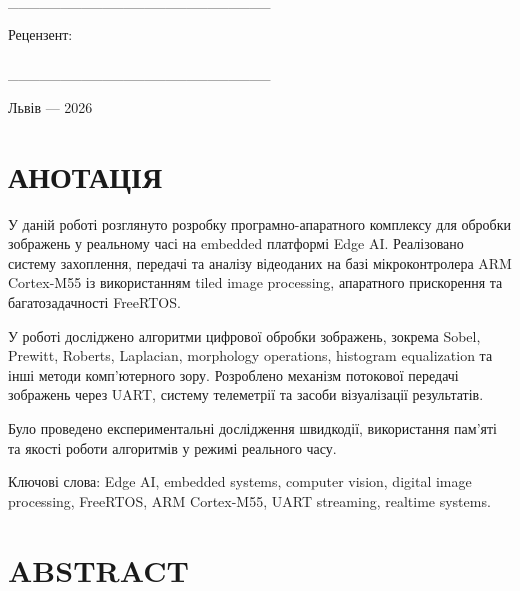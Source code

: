 \documentclass[14pt,a4paper]{extreport}
\begin{document}
\begin{titlepage}
\begin{center}
\begin{flushright}
\underline{\hspace{5cm}}\\
_________________________

\vspace{1cm}

Рецензент:\\

\underline{\hspace{5cm}}\\
_________________________

\end{flushright}

\vfill

Львів --- 2026

\end{center}

\end{titlepage}


\chapter*{АНОТАЦІЯ}

У даній роботі розглянуто розробку програмно-апаратного комплексу для
обробки зображень у реальному часі на embedded платформі Edge AI.
Реалізовано систему захоплення, передачі та аналізу відеоданих на базі
мікроконтролера ARM Cortex-M55 із використанням tiled image processing,
апаратного прискорення та багатозадачності FreeRTOS.

У роботі досліджено алгоритми цифрової обробки зображень, зокрема
Sobel, Prewitt, Roberts, Laplacian, morphology operations,
histogram equalization та інші методи комп’ютерного зору.
Розроблено механізм потокової передачі зображень через UART,
систему телеметрії та засоби візуалізації результатів.

Було проведено експериментальні дослідження швидкодії,
використання пам’яті та якості роботи алгоритмів у режимі
реального часу.

Ключові слова:
Edge AI, embedded systems, computer vision, digital image processing,
FreeRTOS, ARM Cortex-M55, UART streaming, realtime systems.


\chapter*{ABSTRACT}
\end{document}
